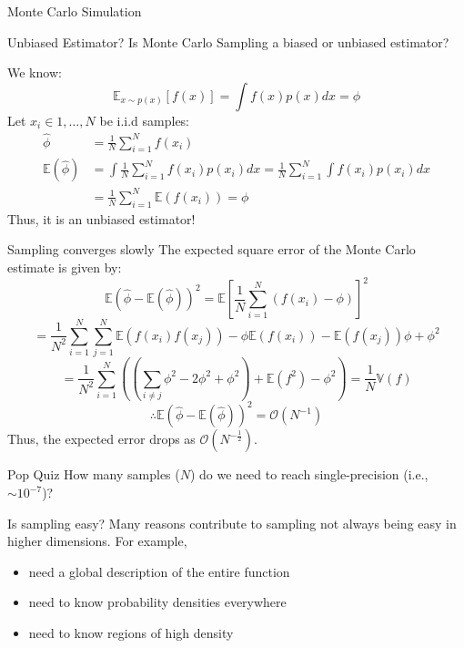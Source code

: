 \documentclass{beamer}
\begin{document}
\begin{section}{Monte Carlo Simulation}
    \begin{frame}{Unbiased Estimator?}
        Is Monte Carlo Sampling a biased or unbiased estimator?

        We know:
        \begin{equation}
            \mathbb{E}_{x \sim p(x)}[f(x)] = \int f(x) p(x) dx = \phi
        \end{equation}
        Let $x_i\in 1, \ldots, N$ be i.i.d samples:
        \begin{align*}
            \hat{\phi} &= \frac{1}{N} \sum_{i=1}^{N} f(x_i) \\
            \mathbb{E}(\hat{\phi}) &= \int \frac{1}{N} \sum_{i=1}^{N} f(x_i)p(x_i)dx = \frac{1}{N}\sum_{i=1}^{N} \int f(x_i)p(x_i)dx \\
            &= \frac{1}{N}\sum_{i=1}^N\mathbb{E}(f(x_i)) = \phi
        \end{align*}
        Thus, it is an unbiased estimator!
    \end{frame}

    \begin{frame}{Sampling converges slowly}
        The expected square error of the Monte Carlo estimate is given by:
        $$
        \mathbb{E} \left( \hat{\phi} - \mathbb{E} (\hat{\phi}) \right)^2 = \mathbb{E} \left[ \frac{1}{N} \sum_{i=1}^{N} (f(x_i) - \phi) \right]^2 
        $$
        $$
        = \frac{1}{N^2} \sum_{i=1}^{N} \sum_{j=1}^{N} \mathbb{E} (f(x_i) f(x_j)) - \phi \mathbb{E} (f(x_i)) - \mathbb{E} (f(x_j)) \phi + \phi^2
        $$
        $$
        = \frac{1}{N^2} \sum_{i=1}^{N} \left( \left( \sum_{i \neq j}^{} \phi^2 - 2 \phi^2 + \phi^2 \right) + \mathbb{E} (f^2) - \phi^2 \right) = \frac{1}{N} \mathbb{V} (f)
        $$
        $$
        \therefore \mathbb{E} \left( \hat{\phi} - \mathbb{E} (\hat{\phi}) \right)^2 = \mathcal{O} (N^{-1})
        $$
        Thus, the expected error drops as $\mathcal{O} (N^{-\frac{1}{2}})$.
    \end{frame}

    \begin{frame}{Pop Quiz}
        How many samples ($N$) do we need to reach single-precision (i.e., $\sim 10^{-7}$)?
    \end{frame}

    \begin{frame}{Is sampling easy?}
        Many reasons contribute to sampling not always being easy in higher dimensions. For example,
        \begin{itemize}
            \item need a global description of the entire function
            \item need to know probability densities everywhere
            \item need to know regions of high density
        \end{itemize}
    \end{frame}


\end{section}
\end{document}
